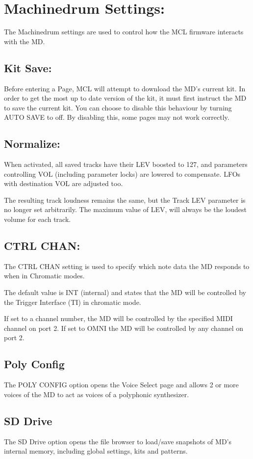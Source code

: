 \chapter{Machinedrum Settings:}
The Machinedrum settings are used to control how the MCL firmware interacts with the MD.

\section{Kit Save:}
Before entering a Page, MCL will attempt to download the MD’s current kit. In order to get
the most up to date version of the kit, it must first instruct the MD to save the current kit. You can choose to disable this behaviour by turning AUTO SAVE to off. By disabling this, some pages may not work correctly.
\section{Normalize:}
When activated, all saved tracks have their LEV boosted to 127, and parameters controlling VOL (including parameter locks) are lowered
to compensate. LFOs with destination VOL are 
adjusted too.

The resulting track loudness remains the same, but the Track LEV parameter is no longer set arbitrarily. The maximum value of LEV, will always be the loudest volume for each track.
\section{CTRL CHAN:}
The CTRL CHAN setting is used to specify which note data the MD responds to when in Chromatic modes.

The default value is INT (internal) and states that the MD will be controlled by the Trigger Interface (TI) in chromatic mode.

If set to a channel number, the MD will be controlled by the specified MIDI channel on port 2. If set to OMNI the MD will be controlled by any channel on port 2.
\section{Poly Config}
The POLY CONFIG option opens the Voice Select page and allows 2 or more voices of the MD to act as voices of a polyphonic synthesizer.
\section{SD Drive}
The SD Drive option opens the file browser to load/save snapshots of MD's internal memory, including global settings, kits and patterns.